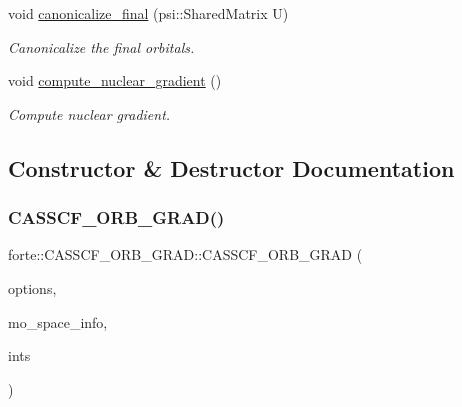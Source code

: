 \begin{DoxyCompactItemize}
void \mbox{\hyperlink{classforte_1_1_c_a_s_s_c_f___o_r_b___g_r_a_d_aa1fc98eedabab33244848f27c027a723}{canonicalize\+\_\+final}} (psi\+::\+Shared\+Matrix U)
\begin{DoxyCompactList}\small\item\em Canonicalize the final orbitals. \end{DoxyCompactList}\item 
void \mbox{\hyperlink{classforte_1_1_c_a_s_s_c_f___o_r_b___g_r_a_d_aa77c144e764615ff260c1322374fb96e}{compute\+\_\+nuclear\+\_\+gradient}} ()
\begin{DoxyCompactList}\small\item\em Compute nuclear gradient. \end{DoxyCompactList}\end{DoxyCompactItemize}


\subsection{Constructor \& Destructor Documentation}
\mbox{\label{classforte_1_1_c_a_s_s_c_f___o_r_b___g_r_a_d_ac61ecacaaa036b564784770e14b9cf4a}} 
\subsubsection{\texorpdfstring{C\+A\+S\+S\+C\+F\+\_\+\+O\+R\+B\+\_\+\+G\+R\+A\+D()}{CASSCF\_ORB\_GRAD()}}
{\footnotesize\ttfamily forte\+::\+C\+A\+S\+S\+C\+F\+\_\+\+O\+R\+B\+\_\+\+G\+R\+A\+D\+::\+C\+A\+S\+S\+C\+F\+\_\+\+O\+R\+B\+\_\+\+G\+R\+AD (\begin{DoxyParamCaption}\item[{std\+::shared\+\_\+ptr$<$ \mbox{\hyperlink{classforte_1_1_forte_options}{Forte\+Options}} $>$}]{options,  }\item[{std\+::shared\+\_\+ptr$<$ \mbox{\hyperlink{classforte_1_1_m_o_space_info}{M\+O\+Space\+Info}} $>$}]{mo\+\_\+space\+\_\+info,  }\item[{std\+::shared\+\_\+ptr$<$ \mbox{\hyperlink{classforte_1_1_forte_integrals}{Forte\+Integrals}} $>$}]{ints }\end{DoxyParamCaption})}



